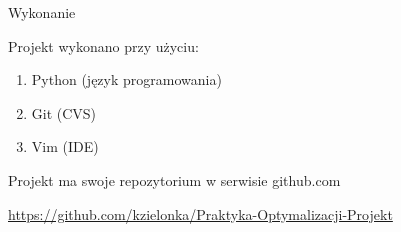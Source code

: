 \begin{frame}{Wykonanie}

	\begin{block}{}
	Projekt wykonano przy użyciu:
	\end{block}
	\begin{enumerate}
		\item Python (język programowania)
		\item Git (CVS)
		\item Vim (IDE)
	\end{enumerate}
	\begin{block}{}
	Projekt ma swoje repozytorium w serwisie github.com
	
	\url{https://github.com/kzielonka/Praktyka-Optymalizacji-Projekt}
	\end{block}
	

\end{frame}
